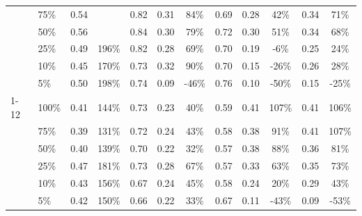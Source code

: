 \begin{longtable}{llcccccccccc}
 & 75\% & 0.54 & \cellcolor{tablegreen!65}\textcolor{white}{226\%} & 0.82 & 0.31 & \cellcolor{tablegreen!24}84\% & 0.69 & 0.28 & \cellcolor{tablegreen!12}42\% & 0.34 & \cellcolor{tablegreen!20}71\% \\
 & 50\% & 0.56 & \cellcolor{tablegreen!67}\textcolor{white}{234\%} & 0.84 & 0.30 & \cellcolor{tablegreen!23}79\% & 0.72 & 0.30 & \cellcolor{tablegreen!14}51\% & 0.34 & \cellcolor{tablegreen!19}68\% \\
 & 25\% & 0.49 & \cellcolor{tablegreen!56}196\% & 0.82 & 0.28 & \cellcolor{tablegreen!20}69\% & 0.70 & 0.19 & \cellcolor[HTML]{E8A0A0}-6\% & 0.25 & \cellcolor{tablegreen!7}24\% \\
 & 10\% & 0.45 & \cellcolor{tablegreen!48}170\% & 0.73 & 0.32 & \cellcolor{tablegreen!26}90\% & 0.70 & 0.15 & \cellcolor[HTML]{E8A0A0}-26\% & 0.26 & \cellcolor{tablegreen!8}28\% \\
 & 5\% & 0.50 & \cellcolor{tablegreen!57}198\% & 0.74 & 0.09 & \cellcolor[HTML]{E8A0A0}-46\% & 0.76 & 0.10 & \cellcolor[HTML]{E8A0A0}-50\% & 0.15 & \cellcolor[HTML]{E8A0A0}-25\% \\
\cmidrule(l){1-12}
\multirow{6}{*}{granite} & 100\% & 0.41 & \cellcolor{tablegreen!41}144\% & 0.73 & 0.23 & \cellcolor{tablegreen!11}40\% & 0.59 & 0.41 & \cellcolor{tablegreen!31}107\% & 0.41 & \cellcolor{tablegreen!30}106\% \\
 & 75\% & 0.39 & \cellcolor{tablegreen!37}131\% & 0.72 & 0.24 & \cellcolor{tablegreen!12}43\% & 0.58 & 0.38 & \cellcolor{tablegreen!26}91\% & 0.41 & \cellcolor{tablegreen!31}107\% \\
 & 50\% & 0.40 & \cellcolor{tablegreen!40}139\% & 0.70 & 0.22 & \cellcolor{tablegreen!9}32\% & 0.57 & 0.38 & \cellcolor{tablegreen!25}88\% & 0.36 & \cellcolor{tablegreen!23}81\% \\
 & 25\% & 0.47 & \cellcolor{tablegreen!52}181\% & 0.73 & 0.28 & \cellcolor{tablegreen!19}67\% & 0.57 & 0.33 & \cellcolor{tablegreen!18}63\% & 0.35 & \cellcolor{tablegreen!21}73\% \\
 & 10\% & 0.43 & \cellcolor{tablegreen!45}156\% & 0.67 & 0.24 & \cellcolor{tablegreen!13}45\% & 0.58 & 0.24 & \cellcolor{tablegreen!6}20\% & 0.29 & \cellcolor{tablegreen!12}43\% \\
 & 5\% & 0.42 & \cellcolor{tablegreen!43}150\% & 0.66 & 0.22 & \cellcolor{tablegreen!10}33\% & 0.67 & 0.11 & \cellcolor[HTML]{E8A0A0}-43\% & 0.09 & \cellcolor[HTML]{E8A0A0}-53\% \\
\end{longtable}
\endgroup